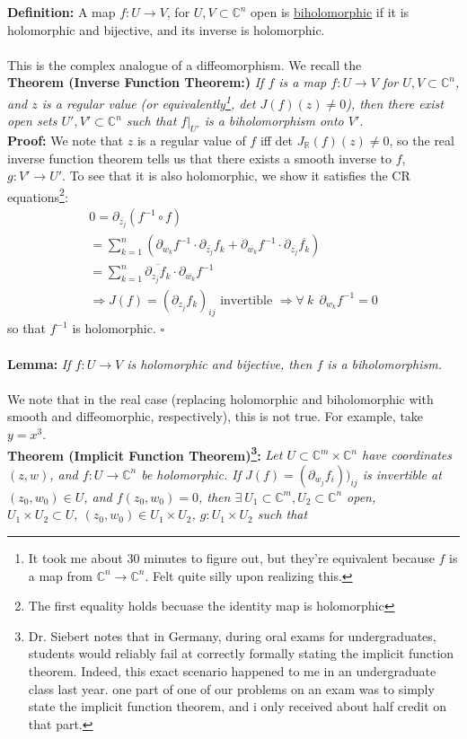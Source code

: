 \documentclass[12pt]{report}
\theoremstyle{definition}
\theoremstyle{remark}
\numberwithin{equation}{section}
\theoremstyle{definition}
\newcommand{\inv}[1]{#1^{-1}}
\newcommand{\bb}[1]{\mathbb{#1}}
\newcommand{\mqed}{\hfill\newline\null \hfill$\square$\\ }
\begin{document}
\textbf{Definition: }A map $f: U \to V$, for $U,V \subset \bb C^n$ open is \underline{biholomorphic} if it is holomorphic and bijective, and its inverse is holomorphic. \\\\
This is the complex analogue of a diffeomorphism. We recall the \\
\textbf{Theorem (Inverse Function Theorem:)} \textit{If $f$ is a map $f: U \to V$ for $U,V \subset \bb C^n$, and $z$ is a regular value (or equivalently\footnote{It took me about 30 minutes to figure out, but they're equivalent because $f$ is a map from $\bb C^n \to \bb C^n$. Felt quite silly upon realizing this.}, det $J(f)(z) \ne 0$), then there exist open sets $U',V' \subset \bb C^n$ such that $f|_{U'}$ is a biholomorphism onto $V'$. }\\
\textbf{Proof: }We note that $z$ is a regular value of $f$ iff det $J_\bb R(f)(z) \ne 0$, so the real inverse function theorem tells us that there exists a smooth inverse to $f$, $g: V' \to U'$. To see that it is also holomorphic, we show it satisfies the CR equations\footnote{The first equality holds becuase the identity map is holomorphic}: 
\begin{gather*}
	0 = \partial_{\overline{z_j}} (\inv f \circ f)\\
	= \sum_{k = 1}^n (\partial_{w_k} \inv f \cdot \partial_{\overline{z_j}} f_k + \partial_{\overline{w_k}} \inv f \cdot \partial_{\overline{z_j}} \overline{f_k})\\
	= \sum_{k =1 }^n\overline{\partial_{z_j}f_k} \cdot \partial_{\overline{w_k}} \inv f\\
	\Rightarrow J(f) = (\partial_{z_j}f_k)_{ij} \text{ invertible } \Rightarrow \forall\ k\ \  \partial_{w_k} \inv f = 0
\end{gather*}
so that $\inv f$ is holomorphic. \mqed\\
\textbf{Lemma: }\textit{If $f: U \to V$ is holomorphic and bijective, then $f$ is a biholomorphism.}\\\\
We note that in the real case (replacing holomorphic and biholomorphic with smooth and diffeomorphic, respectively), this is not true. For example, take $y = x^3$. \\
\textbf{Theorem (Implicit Function Theorem)\footnote{Dr. Siebert notes that in Germany, during oral exams for undergraduates, students would reliably fail at correctly formally stating the implicit function theorem. Indeed, this exact scenario happened to me in an undergraduate class last year. one part of one of our problems on an exam was to simply state the implicit function theorem, and i only received about half credit on that part.}: } \textit{Let $U \subset \bb C^m \times \bb C^n$ have coordinates $(z,w)$, and $f: U \to \bb C^n$ be holomorphic. If $J(f) = (\partial_{w_j} f_i))_{ij}$ is invertible at $(z_0,w_0) \in U$, and $f(z_0,w_0) = 0$, then $\exists\ U_1 \subset \bb C^m, U_2 \subset \bb C^n$ open, $U_1 \times U_2 \subset U,\ (z_0,w_0) \in U_1 \times U_2$, $g: U_1 \times U_2$ such that}
\end{document}
